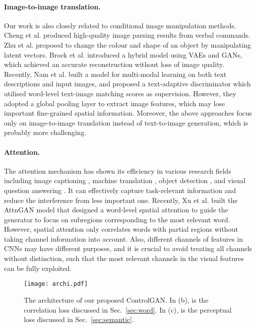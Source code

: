 \documentclass{article}
\begin{document}
\paragraph{Image-to-image translation.} Our work is also closely related to conditional image manipulation methods. Cheng et al. \cite{cheng2014imagespirit} produced high-quality image parsing results from verbal commands. Zhu et al. \cite{zhu2016generative} proposed to change the colour and shape of an object by manipulating latent vectors.
Brock et al. \cite{brock2016neural} introduced a hybrid model using VAEs \cite{kingma2014semi} and GANs, which achieved an accurate reconstruction without loss of {image quality}.
Recently, Nam et al. \cite{nam2018text} built a model for multi-modal learning on both text descriptions and input images, and proposed a text-adaptive discriminator which utilised word-level text-image matching scores as supervision.
However, they adopted a global pooling layer to extract image features, which may lose important fine-grained spatial information. Moreover, the above approaches focus only on image-to-image translation instead of text-to-image generation, which is {probably} more challenging.  
\paragraph{Attention.} The attention mechanism has shown its efficiency in various research fields including image captioning \cite{xu2015show, zhang2017mdnet}, machine translation \cite{bahdanau2014neural}, object detection \cite{oliva2003top, zhang2018progressive}, and visual question answering \cite{yang2016stacked}. 
It can effectively capture task-relevant information and reduce the interference from less important one.
Recently, Xu et al. \cite{xu2018attngan} built the AttnGAN model that designed a word-level spatial attention to guide the generator to focus on subregions corresponding to the most relevant word.
{However, spatial attention only correlates words with partial regions without taking channel information into account. Also, different channels of features in CNNs may have different purposes, and it is crucial to avoid treating all channels without distinction, such that the most relevant channels in the visual features can be fully exploited. }
\begin{figure}[t]
\centering
\begin{minipage}{1\textwidth}
\texttt{[image: archi.pdf]}
\end{minipage}
\caption{The architecture of our proposed ControlGAN. In (b),  is the correlation loss discussed in Sec.~\ref{sec:word}. In (c),  is the perceptual loss discussed in Sec.~\ref{sec:semantic}.}
\label{fig:archi}
\end{figure}
\end{document}
